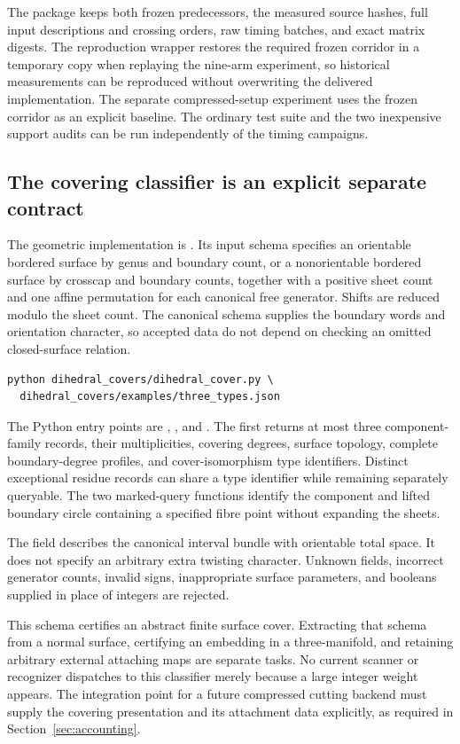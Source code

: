 The package keeps both frozen predecessors, the measured source
hashes, full input descriptions and crossing orders, raw timing
batches, and exact matrix digests. The reproduction wrapper restores
the required frozen corridor in a temporary copy when replaying the
nine-arm experiment, so historical measurements can be reproduced
without overwriting the delivered implementation. The separate
compressed-setup experiment uses the frozen corridor as an explicit
baseline. The ordinary test suite and the two inexpensive support
audits can be run independently of the timing campaigns.

\subsection{The covering classifier is an explicit separate contract}

The geometric implementation is
. Its input schema specifies
an orientable bordered surface by genus and boundary count, or a
nonorientable bordered surface by crosscap and boundary counts,
together with a positive sheet count and one affine permutation for
each canonical free generator. Shifts are reduced modulo the sheet
count. The canonical schema supplies the boundary words and
orientation character, so accepted data do not depend on checking
an omitted closed-surface relation.

\begin{lstlisting}
python dihedral_covers/dihedral_cover.py \
  dihedral_covers/examples/three_types.json
\end{lstlisting}

The Python entry points are ,
, and . The first returns
at most three component-family records, their multiplicities,
covering degrees, surface topology, complete boundary-degree
profiles, and cover-isomorphism type identifiers. Distinct
exceptional residue records can share a type identifier while
remaining separately queryable. The two marked-query functions
identify the component and lifted boundary circle containing a
specified fibre point without expanding the sheets.

The field  describes the
canonical interval bundle with orientable total space. It does not
specify an arbitrary extra twisting character. Unknown fields,
incorrect generator counts, invalid signs, inappropriate surface
parameters, and booleans supplied in place of integers are rejected.

This schema certifies an abstract finite surface cover. Extracting
that schema from a normal surface, certifying an embedding in a
three-manifold, and retaining arbitrary external attaching maps
are separate tasks. No current scanner or recognizer dispatches to
this classifier merely because a large integer weight appears.
The integration point for a future compressed cutting backend must
supply the covering presentation and its attachment data
explicitly, as required in Section~\ref{sec:accounting}.
